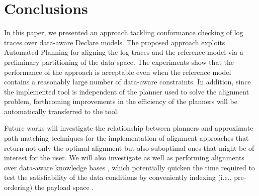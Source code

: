 \section{Conclusions}\label{sec:end}
In this paper, we presented an approach tackling conformance checking of log traces over data-aware Declare models. The proposed approach exploits Automated Planning for aligning the log traces and the reference model via a preliminary partitioning of the data space. The experiments show that the performance of the approach is acceptable even when the reference model contains a reasonably large number of data-aware constraints. In addition, since the implemented tool is independent of the planner used to solve the alignment problem, forthcoming improvements in the efficiency of the planners will be automatically transferred to the tool.

Future works will investigate the relationship between planners and approximate path matching techniques \cite{Myers1989} for the implementation of alignment approaches that return not only the optimal alignment but also suboptimal ones that might be of interest for the user. We will also investigate  as well as performing alignments over data-aware knowledge bases \cite{10.1007/978-3-319-39696-5_18}, which potentially quicken the time required to test the satisfiability of the data conditions by conveniently indexing (i.e., pre-ordering) the payload space \cite{IdreosGNMMK12}. 